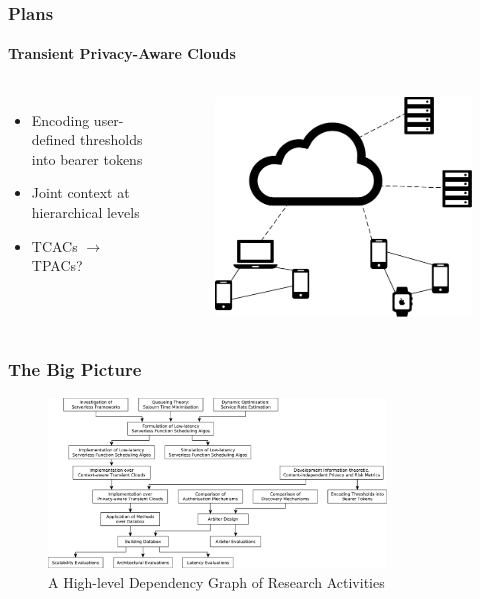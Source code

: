 \documentclass[aspectratio=169]{beamer}
\begin{document}
\begin{frame}
	\frametitle{Plans}
	\framesubtitle{Transient Privacy-Aware Clouds}

	\begin{columns}[c]
		\begin{itemize}
			\item Encoding user-defined thresholds into bearer tokens
			\item Joint context at hierarchical levels
			\item TCACs $\to$ TPACs?
		\end{itemize}
		\begin{figure}
			\centering
			\includegraphics[width=\columnwidth]{tcacs}
		\end{figure}
	\end{columns}
\end{frame}

\begin{frame}
	\frametitle{The Big Picture}

	\begin{figure}[h]
		\centering
		\includegraphics[width=0.8\textwidth]{dependencies}
		\caption{A High-level Dependency Graph of Research Activities}
	\end{figure}
\end{frame}
\end{document}
